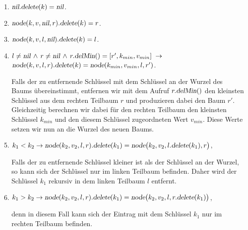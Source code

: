 \begin{enumerate}
\item $\textsl{nil}\mathtt{.}\textsl{delete}(k) = \textsl{nil}$.
\item $\textsl{node}(k,v,\textsl{nil},r)\mathtt{.}\textsl{delete}(k) = r$.
\item $\textsl{node}(k,v,l,\textsl{nil})\mathtt{.}\textsl{delete}(k) = l$.
\item $l \not= \textsl{nil} \,\wedge\, r \not= \textsl{nil} \,\wedge\, r\mathtt{.}\textsl{delMin}() = [r',k_{min}, v_{min}]  \;\rightarrow$ \\[0.1cm]
      \hspace*{1.3cm}
      $\textsl{node}(k,v,l,r)\mathtt{.}\textsl{delete}(k) = \textsl{node}(k_{min},v_{min},l,r')$.
      
      Falls der zu entfernende Schl\"ussel mit dem Schl\"ussel an der Wurzel des Baums
      \"ubereinstimmt,  entfernen wir mit dem Aufruf $r\mathtt{.}\textsl{delMin}()$
      den kleinsten Schl\"ussel aus dem rechten Teilbaum  $r$ und produzieren dabei den Baum $r'$.
      Gleichzeitig berechnen wir dabei f\"ur den rechten Teilbaum den kleinsten Schl\"ussel $k_{min}$ und den
      diesem Schl\"ussel zugeordneten Wert $v_{min}$.  Diese Werte setzen wir nun an die
      Wurzel des neuen Baums.

\item $k_1 < k_2 \rightarrow \textsl{node}(k_2,v_2,l,r)\mathtt{.}\textsl{delete}(k_1) = 
       \textsl{node}\bigl(k_2,v_2,l\mathtt{.}\textsl{delete}(k_1),r\bigr)$,

      Falls der zu entfernende Schl\"ussel kleiner ist als der Schl\"ussel an der Wurzel,
      so kann sich der Schl\"ussel nur im linken Teilbaum befinden.  Daher wird der
      Schl\"ussel $k_1$ rekursiv in dem linken Teilbaum $l$ entfernt.
\item $k_1 > k_2 \rightarrow \textsl{node}(k_2,v_2,l,r)\mathtt{.}\textsl{delete}(k_1) = 
       \textsl{node}\bigl(k_2,v_2,l,r\mathtt{.}\textsl{delete}(k_1)\bigr)$,

      denn in diesem Fall kann sich der Eintrag mit dem Schl\"ussel $k_1$  nur im rechten Teilbaum befinden.
\end{enumerate}


